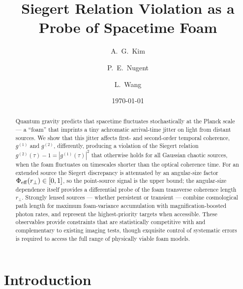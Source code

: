 \documentclass[aps,prd,onecolumn,amsmath,amssymb]{revtex4-2}
\begin{document}
\title{Siegert Relation Violation as a Probe of Spacetime Foam}

\author{A.\ G.\ Kim}
\author{P.\ E.\ Nugent}
\author{L.\ Wang}

\date{\today}

\begin{abstract}
Quantum gravity predicts that spacetime fluctuates stochastically at the Planck
scale --- a ``foam'' that imprints a tiny achromatic arrival-time jitter on light
from distant sources.
We show that this jitter affects first- and second-order temporal coherence,
$g^{(1)}$ and $g^{(2)}$, differently, producing a violation of the Siegert relation
$g^{(2)}(\tau) - 1 = |g^{(1)}(\tau)|^2$ that otherwise holds for all Gaussian chaotic
sources, when the foam fluctuates on timescales shorter than the optical coherence time.
For an extended source the Siegert discrepancy is attenuated by an
angular-size factor $\Phi_{\rm eff}(r_\perp)\in[0,1]$, so the
point-source signal is the upper bound; the angular-size dependence
itself provides a differential probe of the foam transverse coherence
length $r_\perp$.
Strongly lensed sources --- whether persistent or transient --- combine
cosmological path length for maximum foam-variance accumulation with
magnification-boosted photon rates, and represent the highest-priority
targets when accessible.
These observables provide constraints that are statistically competitive with and complementary to existing imaging tests, though exquisite control of systematic errors is required to access the full range of physically viable foam models.
\end{abstract}

\maketitle

\section{Introduction}
\label{sec:intro}
\end{document}

